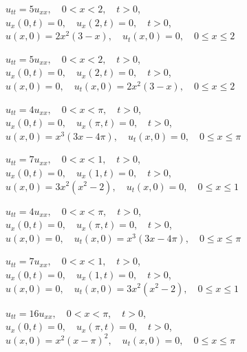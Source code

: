 \begin{exerciselist}

  \item\label{exer:12.2.50} $u_{tt}=5u_{xx},\quad0<x<2,\quad t>0$,\\ $u_{x}(0,t)=0,\quad u_{x}(2,t)=0,\quad t>0$,\\ $u(x,0)=2x^{2}(3-x),\quad u_{t}(x,0)=0,\quad0\le x\le2$

  \item\label{exer:12.2.51} $u_{tt}=5u_{xx},\quad0<x<2,\quad t>0$,\\ $u_{x}(0,t)=0,\quad u_{x}(2,t)=0,\quad t>0$,\\ $u(x,0)=0,\quad u_{t}(x,0)=2x^{2}(3-x),\quad0\le x\le2$

  \item\label{exer:12.2.52} $u_{tt}=4u_{xx},\quad0<x<\pi,\quad t>0$,\\ $u_{x}(0,t)=0,\quad u_{x}(\pi,t)=0,\quad t>0$,\\ $u(x,0)=x^{3}(3x-4\pi),\quad u_{t}(x,0)=0,\quad0\le x\le\pi$

  \item\label{exer:12.2.53} $u_{tt}=7u_{xx},\quad0<x<1,\quad t>0$,\\ $u_{x}(0,t)=0,\quad u_{x}(1,t)=0,\quad t>0$,\\ $u(x,0)=3x^{2}(x^{2}-2),\quad u_{t}(x,0)=0,\quad0\le x\le1$

  \item\label{exer:12.2.54} \Cex $u_{tt}=4u_{xx},\quad0<x<\pi,\quad t>0$,\\ $u_{x}(0,t)=0,\quad u_{x}(\pi,t)=0,\quad t>0$,\\ $u(x,0)=0,\quad u_{t}(x,0)=x^{3}(3x-4\pi),\quad0\le x\le\pi$

  \item\label{exer:12.2.55} $u_{tt}=7u_{xx},\quad0<x<1,\quad t>0$,\\ $u_{x}(0,t)=0,\quad u_{x}(1,t)=0,\quad t>0$,\\ $u(x,0)=0,\quad u_{t}(x,0)=3x^{2}(x^{2}-2),\quad0\le x\le1$

  \item\label{exer:12.2.56} $u_{tt}=16u_{xx},\quad0<x<\pi,\quad t>0$,\\ $u_{x}(0,t)=0,\quad u_{x}(\pi,t)=0,\quad t>0$,\\ $u(x,0)=x^{2}(x-\pi)^{2},\quad u_{t}(x,0)=0,\quad0\le x\le\pi$


\end{exerciselist}
